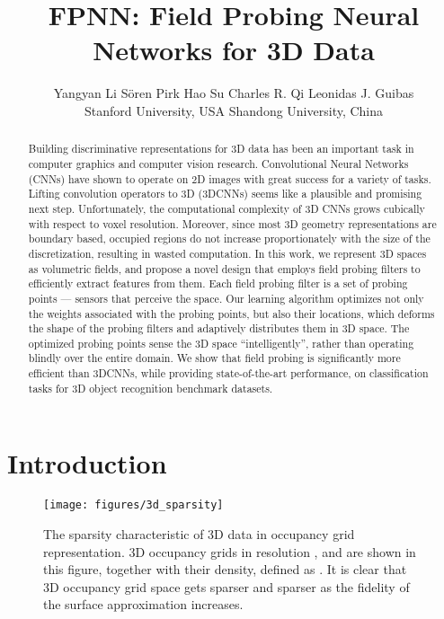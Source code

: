 \documentclass{article}
\title{FPNN: Field Probing Neural Networks for 3D Data}
\author{
	Yangyan Li \hspace{0.1in}
	S\"oren Pirk \hspace{0.1in}
	Hao Su \hspace{0.1in}
	Charles R. Qi \hspace{0.1in}
	Leonidas J. Guibas \vspace{0.05in} \\
	Stanford University, USA \hspace{0.4in} Shandong University, China
	\vspace{-0.2cm}
}
\begin{document}
\maketitle

\vspace{-0.6cm}
\begin{abstract}
\vspace{-0.4cm}
Building discriminative representations for 3D data has been an important task in computer graphics and computer vision research. Convolutional Neural Networks (CNNs) have shown to operate on 2D images with great success for a variety of tasks. Lifting convolution operators to 3D (3DCNNs) seems like a plausible and promising next step. Unfortunately, the computational complexity of 3D CNNs grows cubically with respect to voxel resolution. Moreover, since most 3D geometry representations are boundary based, occupied regions do not increase proportionately with the size of the discretization, resulting in wasted computation. In this work, we represent 3D spaces as volumetric fields, and propose a novel design that employs field probing filters to efficiently extract features from them. Each field probing filter is a set of probing points --- sensors that perceive the space. Our learning algorithm optimizes not only the weights associated with the probing points, but also their locations, which deforms the shape of the probing filters and adaptively distributes them in 3D space. The optimized probing points sense the 3D space ``intelligently'', rather than operating blindly over the entire domain. We show that field probing is significantly more efficient than 3DCNNs, while providing state-of-the-art performance, on classification tasks for 3D object recognition benchmark datasets.
\end{abstract}
 \vspace{-0.6cm}
\section{Introduction}
\label{sec:introduction}

\vspace{-0.2cm}

\begin{wrapfigure}{R}{0.5\linewidth}
	\vspace{-2.0cm}
	\begin{center}
		\texttt{[image: figures/3d\_sparsity]}
	\end{center}
	\vspace{-0.5cm}
	\caption{The sparsity characteristic of 3D data in occupancy grid representation. 3D occupancy grids in resolution ,  and  are shown in this figure, together with their density, defined as . It is clear that 3D occupancy grid space gets sparser and sparser as the fidelity of the surface approximation increases.}
	\label{fig:3d_sparsity}
	\vspace{-0.3cm}
\end{wrapfigure}
\end{document}
